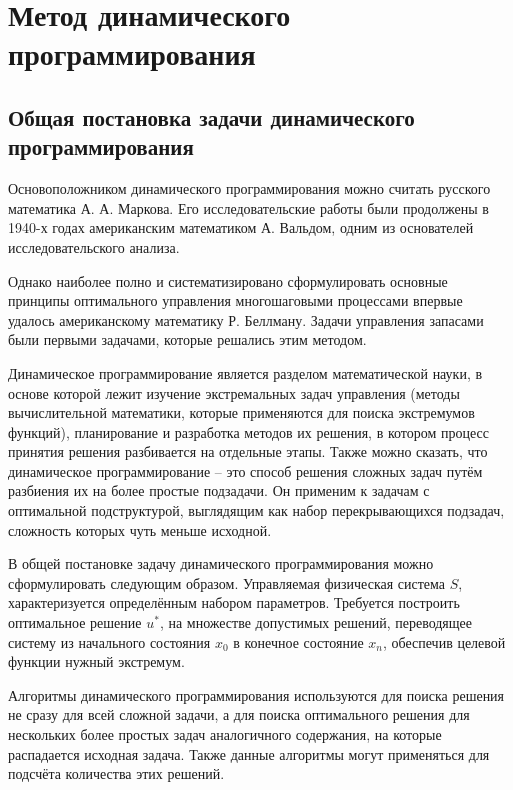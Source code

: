 \setlength{\abovedisplayskip}{0pt}
\setlength{\belowdisplayskip}{0pt}


\section{Метод динамического программирования}

\subsection{Общая постановка задачи динамического программирования}

\indent Основоположником динамического программирования можно считать русского математика А. А. Маркова. Его исследовательские работы были продолжены в 1940-х годах американским математиком А. Вальдом, одним из основателей исследовательского анализа.

Однако наиболее полно и систематизировано сформулировать основные принципы оптимального управления многошаговыми процессами впервые удалось американскому математику Р. Беллману. Задачи управления запасами были первыми задачами, которые решались этим методом.

Динамическое программирование является разделом математической науки, в основе которой лежит изучение экстремальных задач управления (методы вычислительной математики, которые применяются для поиска экстремумов функций), планирование и разработка методов их решения, в котором процесс принятия решения разбивается на отдельные этапы. Также можно сказать, что динамическое программирование -- это способ решения сложных задач путём разбиения их на более простые подзадачи. Он применим к задачам с оптимальной подструктурой, выглядящим как набор перекрывающихся подзадач, сложность которых чуть меньше исходной.

В общей постановке задачу динамического программирования можно сформулировать следующим образом. Управляемая физическая система $S$, характеризуется определённым набором параметров. Требуется построить оптимальное решение $u^*$, на множестве допустимых решений, переводящее систему из начального состояния $x_0$ в конечное состояние $x_n$, обеспечив целевой функции нужный экстремум.

Алгоритмы динамического программирования используются для поиска решения не сразу для всей сложной задачи, а для поиска оптимального решения для нескольких более простых задач аналогичного содержания, на которые распадается исходная задача. Также данные алгоритмы могут применяться для подсчёта количества этих решений.

